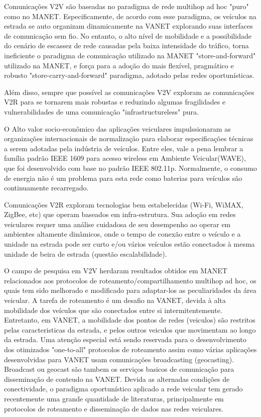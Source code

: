 \documentclass[12pt, %
openright, 
oneside, %
a4paper,    %
brazil]{facom-ufu-abntex2}
\begin{document}
Comunicações V2V são baseadas no paradigma de rede multihop ad hoc "puro" como no MANET. Especificamente, de acordo com esse paradigma, os veículos na estrada se auto organizam dinamicamente na VANET explorando suas interfaces de comunicação sem fio. No entanto, o alto nível de mobilidade e a possibilidade do cenário de escassez de rede causadas pela baixa intensidade do tráfico, torna ineficiente o paradigma de comunicação utilizado na MANET "store-and-forward" utilizado na MANET, e força para a adoção do mais flexível, pragmático e robusto "store-carry-and-forward" paradigma, adotado pelas redes oportunísticas.

Além disso, sempre que possível as comunicações V2V exploram as comunicações V2R para se tornarem mais robustas e reduzindo algumas fragilidades e vulnerabilidades de uma comunicação "infrastructureless" pura.

O Alto valor socio-econômico das aplicações veiculares impulssionaram as organizações internacionais de normalização para elaborar especificações técnicas a serem adotadas pela indústria de veículos. Entre eles, vale a pena lembrar a família padrão IEEE 1609 para acesso wireless em Ambiente Veicular(WAVE), que foi desenvolvido com base no padrão IEEE 802.11p. Normalmente, o consumo de energia não é um problema para esta rede como 
baterias para veículos são continuamente recarregado.

Comunicações V2R exploram tecnologias bem estabelecidas (Wi-Fi, WiMAX, ZigBee, etc) que operam baseados em infra-estrutura. Sua adoção em redes veiculares requer uma análise cuidadosa de seu desempenho ao operar em ambientes altamente dinâmicos, onde o tempo de conexão entre o veículo e a unidade na estrada pode ser curto e/ou vários veículos estão conectados à mesma unidade de beira de estrada (questão escalabilidade).

O campo de pesquisa em V2V herdaram resultados obtidos em MANET relacionados aos protocolos de roteamento/compartilhamento multihop ad hoc, os quais tem sido melhorado e modificado para adaptar-los as peculiaridades da área veicular. A tarefa de roteamento é um desafio na VANET, devida à alta mobilidade dos veículos que são conectados entre si intermitentemente.
Entretanto, em VANET, a mobilidade dos pontos de redes (veiculos) são restritos pelas caracteristicas da estrada, e pelos outros veiculos que movimentam ao longo da estrada. Uma atenção especial está sendo reservada para o desenvolvimento dos otimizados "one-to-all" protocolos de roteamento assim como várias aplicações desenvolvidas para VANET usam comunicações broadcasting (geocasting). Broadcast ou geocast são tambem os serviços basicos de comunicação para disseminação de conteudo na VANET. Devida as alternadas condições de conectividade, o paradigma oportunístico aplicado a rede veicular tem gerado recentemente uma grande quantidade de literaturas, principalmente em protocolos de roteamento e disseminação de dados nas redes veiculares.
\end{document}
